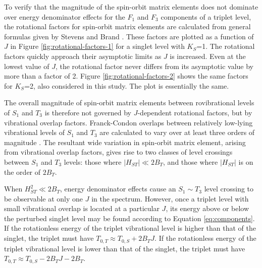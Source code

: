 To verify that the magnitude of the spin-orbit matrix elements does
not dominate over energy denominator effects for the $F_1$ and $F_3$
components of a triplet level, the rotational factors for spin-orbit
matrix elements are calculated from general formulas given by Stevens
and Brand \cite{stevens73}.  These factors are plotted as a function
of $J$ in Figure \ref{fig:rotational-factors-1} for a singlet level
with $K_S$=1.  The rotational factors quickly approach their
asymptotic limits as $J$ is increased.  Even at the lowest value of
$J$, the rotational factor never differs from its asymptotic value by
more than a factor of 2.  Figure \ref{fig:rotational-factors-2} shows
the same factors for $K_S$=2, also considered in this study.  The plot
is essentially the same.

The overall magnitude of spin-orbit matrix elements between
rovibrational levels of $S_1$ and $T_3$ is therefore not governed by
$J$-dependent rotational factors, but by vibrational overlap factors.
Franck-Condon overlaps between relatively low-lying vibrational levels
of $S_1$ and $T_3$ are calculated to vary over at least three orders
of magnitude \cite{thom07}.  The resultant wide variation in
spin-orbit matrix element, arising from vibrational overlap factors,
gives rise to two classes of level crossings between $S_1$ and $T_3$
levels: those where $\lvert H_{ST} \rvert \ll 2B_T$, and those where
$\lvert H_{ST} \rvert$ is on the order of $2B_T$.

When $H_{ST}^2 \ll 2B_T$, energy denominator effects cause an $S_1
\sim T_3$ level crossing to be observable at only one $J$ in the
spectrum.  However, once a triplet level with small vibrational
overlap is located at a particular $J$, its energy above or below the
perturbed singlet level may be found according to Equation
\ref{eq:components}.  If the rotationless energy of the triplet
vibrational level is higher than that of the singlet, the triplet must
have $T_{0,T} \approx T_{0,S} + 2B_TJ$.  If the rotationless energy of
the triplet vibrational level is lower than that of the singlet, the
triplet must have $T_{0,T} \approx T_{0,S} - 2B_TJ - 2B_T$.

